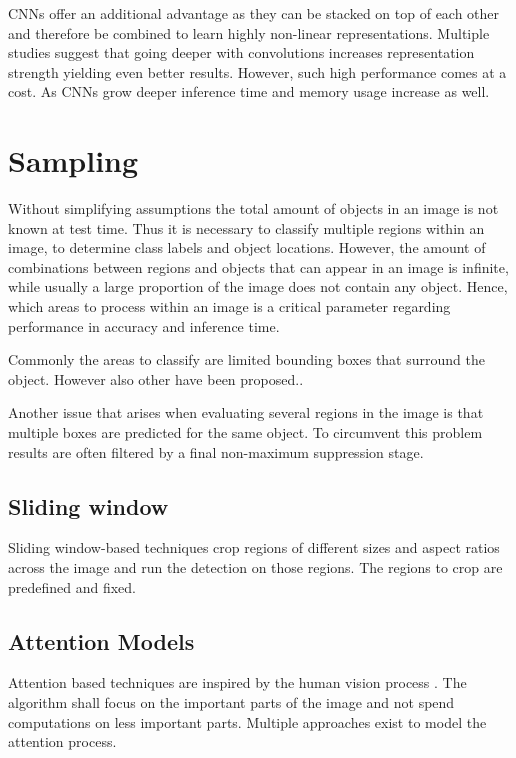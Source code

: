 	\acp{CNN} offer an additional advantage as they can be stacked on top of each other and therefore be combined to learn highly non-linear representations. Multiple studies suggest that going deeper with convolutions increases representation strength yielding even better results. However, such high performance comes at a cost. As \acp{CNN} grow deeper inference time and memory usage increase as well.
	
	\section{Sampling}
	
	Without simplifying assumptions the total amount of objects in an image is not known at test time. Thus it is necessary to classify multiple regions within an image, to determine class labels and object locations. However, the amount of combinations between regions and objects that can appear in an image is infinite, while usually a large proportion of the image does not contain any object. Hence, which areas to process within an image is a critical parameter regarding performance in accuracy and inference time.
	
	Commonly the areas to classify are limited bounding boxes that surround the object. However also other have been proposed..	
	
	Another issue that arises when evaluating several regions in the image is that multiple boxes are predicted for the same object. To circumvent this problem results are often filtered by a final non-maximum suppression stage. 
	
	\subsection{Sliding window}
	
	Sliding window-based techniques crop regions of different sizes and aspect ratios across the image and run the detection on those regions. The regions to crop are predefined and fixed. 
	
	\subsection{Attention Models}
	
	Attention based techniques are inspired by the human vision process . The algorithm shall focus on the important parts of the image and not spend computations on less important parts. Multiple approaches exist to model the attention process.
	
